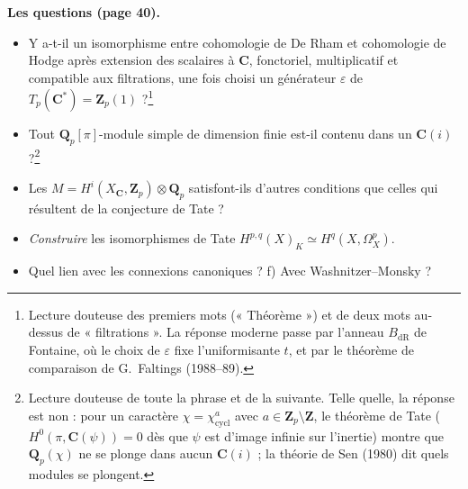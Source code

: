 \documentclass[11pt,a4paper]{article}
\begin{document}
\textbf{Les questions (page 40).}
\begin{itemize}
\item[a)] Y a-t-il un isomorphisme entre cohomologie de De Rham et cohomologie
de Hodge après extension des scalaires à $\mathbf{C}$, fonctoriel, multiplicatif
et compatible aux filtrations, une fois choisi un générateur
$\varepsilon$ de $T_p(\mathbf{C}^*) = \mathbf{Z}_p(1)$ ?\footnote{Lecture
douteuse des premiers mots (« Théorème ») et de deux mots au-dessus de
« filtrations ». La réponse moderne passe par l'anneau $B_{\mathrm{dR}}$ de
Fontaine, où le choix de $\varepsilon$ fixe l'uniformisante $t$, et par le
théorème de comparaison de G.~Faltings (1988--89).}
\item[b)] Tout $\mathbf{Q}_p[\pi]$-module simple de dimension finie est-il
contenu dans un $\mathbf{C}(i)$ ?\footnote{Lecture douteuse de toute la phrase
et de la suivante. Telle quelle, la réponse est non : pour un caractère
$\chi = \chi_{\mathrm{cycl}}^a$ avec $a \in \mathbf{Z}_p \setminus \mathbf{Z}$,
le théorème de Tate ($H^0(\pi, \mathbf{C}(\psi)) = 0$ dès que $\psi$ est d'image
infinie sur l'inertie) montre que $\mathbf{Q}_p(\chi)$ ne se plonge dans aucun
$\mathbf{C}(i)$ ; la théorie de Sen (1980) dit quels modules se plongent.}
\item[c)] Les $M = H^i(X_{\mathbf{C}}, \mathbf{Z}_p) \otimes \mathbf{Q}_p$
satisfont-ils d'autres conditions que celles qui résultent de la conjecture de
Tate ?
\item[d)] \emph{Construire} les isomorphismes de Tate
$H^{p,q}(X)_K \simeq H^q(X, \Omega^p_X)$.
\item[e)] Quel lien avec les connexions canoniques ? f) Avec
Washnitzer--Monsky ?
\end{itemize}
\end{document}
